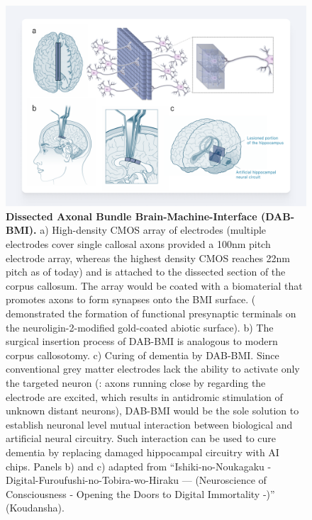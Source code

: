 \documentclass[10pt]{article}
\begin{document}
\begin{sloppypar}
  \begin{figure}[ht!]
    \centering
    \includegraphics[width=\textwidth]{figures/masa-approach-1.png}
    \caption[CHI: Dissected Axonal Bundle Brain-Machine-Interface]{\textbf{Dissected Axonal Bundle Brain-Machine-Interface (DAB-BMI).} a) High-density CMOS array of electrodes (multiple electrodes cover single callosal axons provided a 100nm pitch electrode array, whereas the highest density CMOS reaches 22nm pitch as of today) and is attached to the dissected section of the corpus callosum. The array would be coated with a biomaterial that promotes axons to form synapses onto the BMI surface. (\cite{cho2024site} demonstrated the formation of functional presynaptic terminals on the neuroligin-2-modified gold-coated abiotic surface). b) The surgical insertion process of DAB-BMI is analogous to modern corpus callosotomy. c) Curing of dementia by DAB-BMI. Since conventional grey matter electrodes lack the ability to activate only the targeted neuron (\cite{histed2009direct}: axons running close by regarding the electrode are excited, which results in antidromic stimulation of unknown distant neurons), DAB-BMI would be the sole solution to establish neuronal level mutual interaction between biological and artificial neural circuitry. Such interaction can be used to cure dementia by replacing damaged hippocampal circuitry with AI chips. Panels b) and c) adapted from “Ishiki-no-Noukagaku - Digital-Furoufushi-no-Tobira-wo-Hiraku — (Neuroscience of Consciousness - Opening the Doors to Digital Immortality -)” (Koudansha).}
    \label{fig:masa-approach-1}
  \end{figure}


\end{sloppypar}
\end{document}
